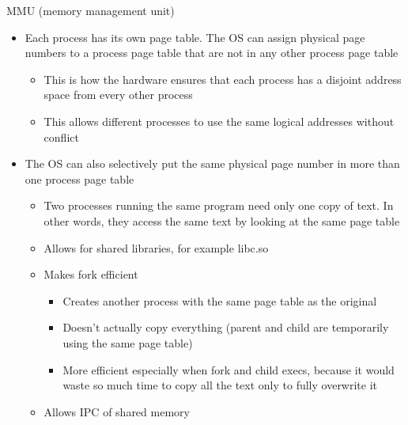 MMU (memory management unit)
\begin{itemize}
    \item Each process has its own page table. The OS can assign physical page numbers to a process page table that are not in any other process page table
    \begin{itemize}
        \item This is how the hardware ensures that each process has a disjoint address space from every other process
        \item This allows different processes to use the same logical addresses without conflict
    \end{itemize}
    \item The OS can also selectively put the same physical page number in more than one process page table
    \begin{itemize}
        \item Two processes running the same program need only one copy of text. In other words, they access the same text by looking at the same page table
        \item Allows for shared libraries, for example libc.so
        \item Makes fork efficient
        \begin{itemize}
            \item Creates another process with the same page table as the original
            \item Doesn't actually copy everything (parent and child are temporarily using the same page table)
            \item More efficient especially when fork and child execs, because it would waste so much time to copy all the text only to fully overwrite it
        \end{itemize}
        \item Allows IPC of shared memory
    \end{itemize}
\end{itemize}
